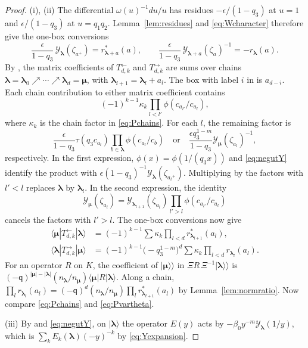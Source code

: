 \documentclass[11pt]{amsart}
\theoremstyle{definition}
\theoremstyle{remark}
\newcommand{\Mq}{\mathsf q}                      %
\newcommand{\betaz}{\beta_0}                     %
\newcommand{\bl}{{\boldsymbol{\lambda}}}         %
\newcommand{\bmu}{{\boldsymbol{\mu}}}
\newcommand{\bwt}[1]{\zeta_{#1}}                 %
\newcommand{\CY}{\mathcal Y}
\newcommand{\Yfn}[1]{\CY_{#1}}                   %
\newcommand{\res}[2]{r_{#1}(#2)}                 %
\newcommand{\cores}[2]{r^*_{#1}(#2)}             %
\newcommand{\Newton}[1]{E_{#1}}                  %
\newcommand{\srcnorm}[1]{n_{#1}}                 %
\newcommand{\ceig}[1]{c_{#1}}                    %
\newcommand{\bplus}[1]{{#1}^{+}}                 %
\newcommand{\kket}[1]{\lvert #1\rangle\!\rangle} %
\begin{document}
\begin{proof}
(i), (ii) The differential \(\omega(u)^{-1}du/u\) has residues \(-\epsilon/(1-q_3)\) at \(u=1\) and
\(\epsilon/(1-q_3)\) at \(u=q_1q_2\). Lemma~\ref{lem:residues} and
\eqref{eq:Wcharacter} therefore give the one-box conversions
\[
 \frac{\epsilon}{1-q_3}\,\Yfn{\bl}(\bwt{\bplus{a}})=\cores{\bl+a}{a},\qquad
 \frac{\epsilon}{1-q_3}\,\Yfn{\bl+a}(\bwt{a})^{-1}=-\res{\bl}{a}.
\]
By \cite[(3.21), (3.22)]{N3}, the matrix coefficients of
\(T^{\leftarrow}_{d,k}\) and \(T^{\rightarrow}_{d,k}\) are sums over chains
\(\bl=\bl_0\nearrow\cdots\nearrow\bl_d=\bmu\), with
\(\bl_{l+1}=\bl_l+a_l\). The box with label \(i\) in \cite{N3} is \(a_{d-i}\).
Each chain contribution to either matrix coefficient contains
\[
 (-1)^{k-1}\kappa_k\prod_{l<l'}\phi(\ceig{a_{l'}}/\ceig{a_l}),
\]
where \(\kappa_k\) is the chain factor in \eqref{eq:Pchains}.
For each \(l\), the remaining factor is
\[
 \frac{\epsilon}{1-q_3}\tau(q_3\ceig{a_l})
   \prod_{b\in\bl}\phi(\ceig{a_l}/\ceig{b})
 \quad\text{or}\quad
 \frac{\epsilon q_3^{1-m}}{1-q_3}\Yfn{\bmu}(\bwt{a_l})^{-1},
\]
respectively. In the first expression,
\(\phi(x)=\phi(1/(q_3x))\) \cite[(2.2)]{N3} and \eqref{eq:negutY}
identify the product with
\(\epsilon(1-q_3)^{-1}\Yfn{\bl}(\bwt{\bplus{a_l}})\).
Multiplying by the factors with \(l'<l\) replaces \(\bl\) by \(\bl_l\).
In the second expression, the identity
\[
 \Yfn{\bmu}(\bwt{a_l})
 =\Yfn{\bl_{l+1}}(\bwt{a_l})
   \prod_{l'>l}\phi(\ceig{a_{l'}}/\ceig{a_l})
\]
cancels the factors with \(l'>l\). The one-box conversions now give
\begin{align*}
 \langle\bmu|T^{\leftarrow}_{d,k}|\bl\rangle&=(-1)^{k-1}\sum\kappa_k\prod_{l<d}\cores{\bl_{l+1}}{a_l},\\
 \langle\bl|T^{\rightarrow}_{d,k}|\bmu\rangle&=(-1)^{k-1}\bigl(-q_3^{1-m}\bigr)^d\sum\kappa_k\prod_{l<d}\res{\bl_l}{a_l}.
\end{align*}
For an operator \(R\) on \(K\), the coefficient of \(\kket{\bmu}\) in \(\Xi R\,\Xi^{-1}\kket{\bl}\) is
\((-\Mq)^{|\bmu|-|\bl|}(\srcnorm{\bl}/\srcnorm{\bmu})\langle\bmu|R|\bl\rangle\). Along a chain,
\(\prod_l\res{\bl_l}{a_l}=(-\Mq)^d(\srcnorm{\bl}/\srcnorm{\bmu})\prod_l\cores{\bl_{l+1}}{a_l}\) by
Lemma~\ref{lem:normratio}. Now compare \eqref{eq:Pchains} and \eqref{eq:Pvartheta}.

(iii) By \cite[(2.55) and (3.23)]{N3} and \eqref{eq:negutY}, on \(|\bl\rangle\) the operator \(E(y)\) acts by
\(-\betaz y^{-m}\Yfn{\bl}(1/y)\), which is \(\sum_k\Newton{k}(\bl)(-y)^{-k}\) by \eqref{eq:Yexpansion}.


\end{proof}
\end{document}
